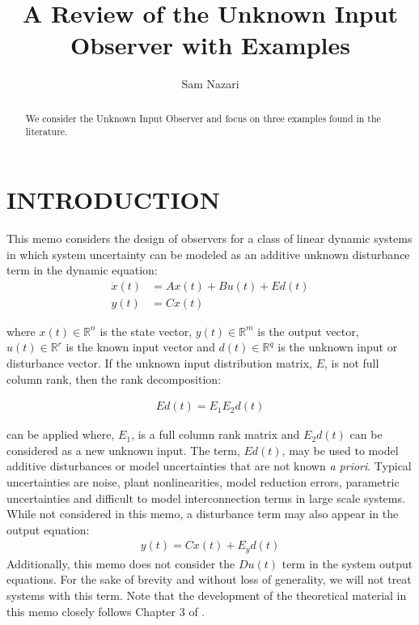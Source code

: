 \documentclass{amsart}
\theoremstyle{definition}
\theoremstyle{remark}
\numberwithin{equation}{section}
\begin{document}
\title{A Review of the Unknown Input Observer with Examples}

\author{Sam Nazari}
\address{Department of Electrical \& Computer Engineering, Northeastern University, Boston, MA,02210}










\begin{abstract}
We consider the Unknown Input Observer and focus on three examples found in the literature.
\end{abstract}

\maketitle
\section{INTRODUCTION}
\label{sec:intro}  

This memo considers the design of observers for a class of linear dynamic systems in which system uncertainty can be modeled as an additive unknown disturbance term in the dynamic equation: 
\begin{align} \label{eq:linSys}
\dot{x}(t) &= Ax(t) + Bu(t) + Ed(t) \\
y(t)       &= Cx(t) \nonumber
\end{align}



\noindent where $x(t) \in \mathbb{R}^n$ is the state vector, $y(t) \in \mathbb{R}^m$ is the output vector, $u(t) \in \mathbb{R}^r$ is the known input vector and $d(t) \in \mathbb{R}^q$ is the unknown input or disturbance vector. If the unknown input distribution matrix, $E$, is not full column rank, then the rank decomposition: 

\begin{align*}
Ed(t) = E_1 E_2 d(t)
\end{align*}

can be applied where, $E_1$, is a full column rank matrix and $E_2 d(t)$ can be considered as a new unknown input. The term, $Ed(t)$, may be used to model additive disturbances or model uncertainties that are not known \textit{a priori}. Typical uncertainties are noise, plant nonlinearities, model reduction errors, parametric uncertainties and difficult to model interconnection terms in large scale systems. While not considered in this memo, a disturbance term may also appear in the output equation:
\begin{align*}
y(t) = Cx(t)+E_y d(t)
\end{align*}
Additionally, this memo does not consider the $Du(t)$ term in the system output equations.  For the sake of brevity and without loss of generality, we will not treat systems with this term. Note that the development of the theoretical material in this memo closely follows Chapter 3 of \cite{Chen99}. 
\end{document}
